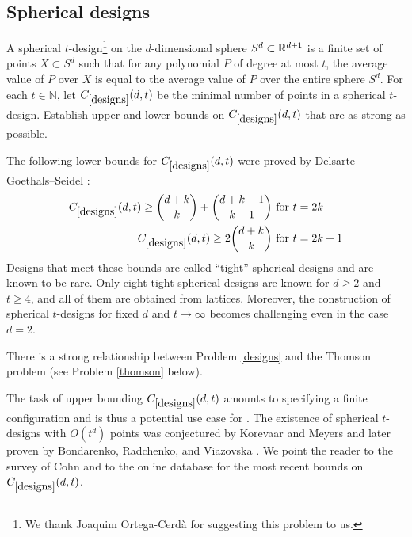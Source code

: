 \subsection{Spherical designs}

\renewcommand{\problemURL}{https://google-deepmind.github.io/alphaevolve_repository_of_problems/problems/32.html}

\begin{problem}\label{designs} A spherical $t$-design\footnote{We thank Joaquim Ortega-Cerd\`a for suggesting this problem to us.} on the $d$-dimensional sphere $S^d \subset \mathbb{R}^{d+1}$ is a finite set of points $X \subset S^d$ such that for any polynomial $P$ of degree at most $t$, the average value of $P$ over $X$ is equal to the average value of $P$ over the entire sphere $S^d$. For each $t \in \mathbb{N}$, let $C_{\ref{designs}}(d,t)$ be the minimal number of points in a spherical $t$-design. Establish upper and lower bounds on $C_{\ref{designs}}(d,t)$ that are as strong as possible.
\end{problem}

The following lower bounds for $C_{\ref{designs}}(d,t)$ were proved by Delsarte--Goethals--Seidel \cite{delsarte-goethals-seidel}: 
\begin{align*}
C_{\ref{designs}}(d,t) \geq \binom{d+k}{k} + \binom{d+k-1}{k-1} & \text{ for } t = 2k \\
C_{\ref{designs}}(d,t) \geq 2\binom{d+k}{k} & \text{ for } t = 2k+1
\end{align*}
Designs that meet these bounds are called ``tight'' spherical designs and are known to be rare.  Only eight tight spherical designs are known for $d \geq 2$ and $t \geq 4$, and all of them are obtained from lattices. Moreover, the construction of spherical $t$-designs for fixed $d$ and $t \to \infty$ becomes challenging even in the case 
$d = 2$. 

There is a strong relationship \cite{saffkuijlaars} between Problem \ref{designs} and the Thomson problem (see Problem \ref{thomson} below).

The task of upper bounding $C_{\ref{designs}}(d,t)$ amounts to specifying a finite configuration and is thus a potential use case for \AlphaEvolve. 
The existence of spherical $t$-designs with $O(t^d)$ points was conjectured by Korevaar and Meyers \cite{korevaarmeyers} and later proven by Bondarenko, Radchenko, and Viazovska \cite{bondarenkoradchenkoviazovska}. We point the reader to the survey of Cohn \cite{cohn-icm} and to the online database \cite{sloane_spherical} for the most recent bounds on $C_{\ref{designs}}(d,t)$.

